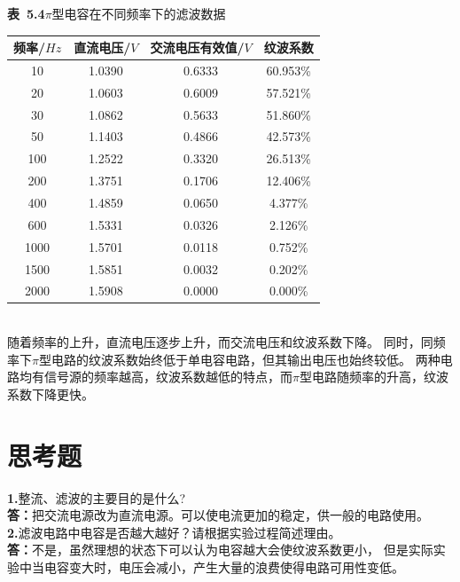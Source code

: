\documentclass{article}
\def\kong{\hspace*{2em}}
\begin{document}
        \begin{minipage}{1\linewidth}
            \centering
            \textbf{表\ 5.4}\quad $\pi$型电容在不同频率下的滤波数据  \\[4pt]
            \begin{tabular}{|c|c|c|c|}
            \hline
                    频率/$Hz$        & 直流电压/$V$   & 交流电压有效值/$V$  & 纹波系数  \\ \hline
                    10   & 1.0390 & 0.6333 & 60.953\% \\ \hline
                    20   & 1.0603 & 0.6009 & 57.521\% \\ \hline
                    30   & 1.0862 & 0.5633 & 51.860\% \\ \hline
                    50   & 1.1403 & 0.4866 & 42.573\% \\ \hline
                    100  & 1.2522 & 0.3320 & 26.513\% \\ \hline
                    200  & 1.3751 & 0.1706 & 12.406\% \\ \hline
                    400  & 1.4859 & 0.0650 & 4.377\% \\ \hline
                    600  & 1.5331 & 0.0326 & 2.126\% \\ \hline
                    1000 & 1.5701 & 0.0118 & 0.752\% \\ \hline
                    1500 & 1.5851 & 0.0032 & 0.202\% \\ \hline
                    2000 & 1.5908 & 0.0000 & 0.000\% \\ \hline
            \end{tabular}
        \end{minipage}\\[14pt]
        \kong 随着频率的上升，直流电压逐步上升，而交流电压和纹波系数下降。
        同时，同频率下$\pi$型电路的纹波系数始终低于单电容电路，但其输出电压也始终较低。
        两种电路均有信号源的频率越高，纹波系数越低的特点，而$\pi$型电路随频率的升高，纹波系数下降更快。
    
\section{思考题}
    \kong \textbf{1.}整流、滤波的主要目的是什么?\\
    \kong \textbf{答：}把交流电源改为直流电源。可以使电流更加的稳定，供一般的电路使用。\\
    \kong \textbf{2.}滤波电路中电容是否越大越好？请根据实验过程简述理由。\\
    \kong \textbf{答：}不是，虽然理想的状态下可以认为电容越大会使纹波系数更小，
    但是实际实验中当电容变大时，电压会减小，产生大量的浪费使得电路可用性变低。\\
\end{document}
